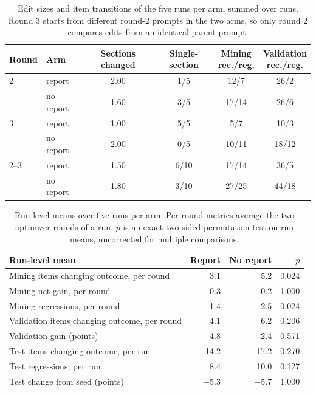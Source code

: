 \documentclass[11pt]{article}
\begin{document}
\begin{table}[!tp]
\centering
\small
\setlength{\tabcolsep}{3.5pt}
\begin{tabular}{llcccc}
\toprule
\rowcolor{midblue}Round & Arm & Sections changed & Single-section & \shortstack{Mining\\rec./reg.} & \shortstack{Validation\\rec./reg.} \\
\midrule
2 & report & 2.00 & 1/5 & 12/7 & 26/2 \\
 & no report & 1.60 & 3/5 & 17/14 & 26/6 \\
\midrule
3 & report & 1.00 & 5/5 & 5/7 & 10/3 \\
 & no report & 2.00 & 0/5 & 10/11 & 18/12 \\
\midrule
2--3 & report & 1.50 & 6/10 & 17/14 & 36/5 \\
 & no report & 1.80 & 3/10 & 27/25 & 44/18 \\
\bottomrule
\end{tabular}
\caption{Edit sizes and item transitions of the five runs per arm, summed over runs. Round 3 starts from different
round-2 prompts in the two arms, so only round 2 compares edits from an identical parent prompt.}
\label{tab:ablation_rounds}
\end{table}

\begin{table}[!tp]
\centering
\small
\setlength{\tabcolsep}{4pt}
\begin{tabular}{lrrr}
\toprule
\rowcolor{midblue}Run-level mean & Report & No report & $p$ \\
\midrule
Mining items changing outcome, per round & 3.1 & 5.2 & 0.024 \\
Mining net gain, per round & 0.3 & 0.2 & 1.000 \\
Mining regressions, per round & 1.4 & 2.5 & 0.024 \\
Validation items changing outcome, per round & 4.1 & 6.2 & 0.206 \\
Validation gain (points) & 4.8 & 2.4 & 0.571 \\
Test items changing outcome, per run & 14.2 & 17.2 & 0.270 \\
Test regressions, per run & 8.4 & 10.0 & 0.127 \\
Test change from seed (points) & $-5.3$ & $-5.7$ & 1.000 \\
\bottomrule
\end{tabular}
\caption{Run-level means over five runs per arm. Per-round metrics average the two optimizer rounds of a run. $p$ is an
exact two-sided permutation test on run means, uncorrected for multiple comparisons.}
\label{tab:ablation_runs}
\end{table}
\end{document}
